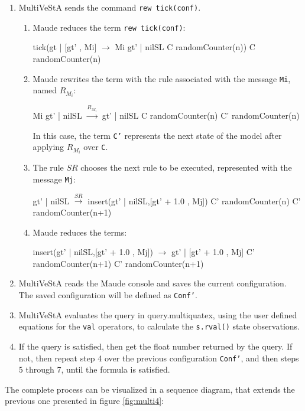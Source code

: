 \begin{enumerate}
\item MultiVeStA sends the command \texttt{rew tick(conf)}.
    \begin{enumerate}
        \item Maude reduces the term \texttt{rew tick(conf)}:
        \begin{maude}

tick({gt | [gt' , Mi]}     $\rightarrow$  Mi {gt' | nilSL }
     {C randomCounter(n)})    {C randomCounter(n)}\end{maude}
        \item Maude rewrites the term with the rule associated with the message \texttt{Mi}, named $R_{M_i}$:
        \begin{maude}
        
Mi {gt' | nilSL}    $\xrightarrow{R_{M_i}}$ {gt' | nilSL }
{C randomCounter(n)}     {C'  randomCounter(n)}
        \end{maude}
        In this case, the term \texttt{C'} represents the next state of the model after applying $R_{M_i}$ over \texttt{C}.
        \item The rule $SR$ chooses the next rule to be executed, represented with the message \texttt{Mj}:
        \begin{maude}

{gt' | nilSL }        $\xrightarrow{SR}$   insert({gt' | nilSL},[gt' + 1.0 , Mj])
{C' randomCounter(n)}       {C' randomCounter(n+1)}\end{maude}
        
        \item Maude reduces the terms:
        \begin{maude}
        
insert({gt' | nilSL},[gt' + 1.0 , Mj]) $\rightarrow$ {gt' | [gt' + 1.0 , Mj]} 
{C' randomCounter(n+1)}                   {C' randomCounter(n+1)}\end{maude}
    \end{enumerate}

    \item MultiVeStA reads the Maude console and saves the current configuration. The saved configuration will be defined as \texttt{Conf'}.

    \item MultiVeStA evaluates the query in query.multiquatex, using the user defined equations for the \texttt{val} operators, to calculate the \texttt{s.rval()} state observations.
    \item If the query is satisfied, then get the float number returned by the query. If not, then repeat step 4 over the previous configuration \texttt{Conf'}, and then steps 5 through 7, until the formula is satisfied.
\end{enumerate}
The complete process can be visualized in a sequence diagram, that extends the previous one presented in figure \ref{fig:multi4}:

